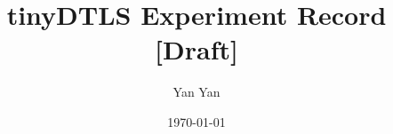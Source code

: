 \documentclass[12pt, ieee]{report}
\title{tinyDTLS Experiment Record [Draft]}
\author{Yan Yan}
\date{\today}
\theoremstyle{plain}
\theoremstyle{definition}
\theoremstyle{remark}
\begin{document}
\maketitle

\tableofcontents

%



\begin{appendices}
{}
\end{appendices}



\end{document}
